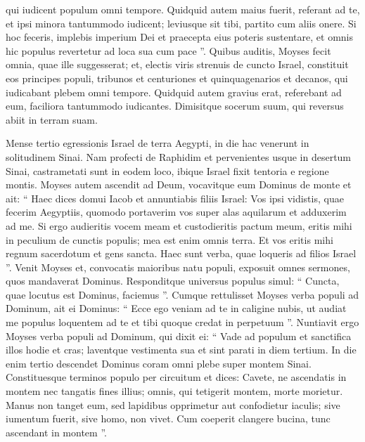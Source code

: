 \begin{biblechapter}
\begin{biblechapter}
\begin{biblechapter}
\begin{biblechapter}
\begin{biblechapter}
\begin{biblechapter}
\begin{biblechapter}
\begin{biblechapter}
\begin{biblechapter}
\begin{biblechapter}
\begin{biblechapter}
\begin{biblechapter}
\begin{biblechapter}
\begin{biblechapter}
\begin{biblechapter}
\begin{biblechapter}
\begin{biblechapter}
\begin{biblechapter}
\verse qui iudicent populum omni tempore. Quidquid autem maius fuerit, referant ad te, et ipsi minora tantummodo iudicent; leviusque sit tibi, partito cum aliis onere. 
\verse Si hoc feceris, implebis imperium Dei et praecepta eius poteris sustentare, et omnis hic populus revertetur ad loca sua cum pace ”.
 \verse Quibus auditis, Moyses fecit omnia, quae ille suggesserat; 
\verse et, electis viris strenuis de cuncto Israel, constituit eos principes populi, tribunos et centuriones et quinquagenarios et decanos, 
\verse qui iudicabant plebem omni tempore. Quidquid autem gravius erat, referebant ad eum, faciliora tantummodo iudicantes. 
\verse Dimisitque socerum suum, qui reversus abiit in terram suam.
 
\begin{biblechapter}
\verse Mense tertio egressionis Israel de terra Aegypti, in die hac venerunt in solitudinem Sinai. 
\verse Nam profecti de Raphidim et pervenientes usque in desertum Sinai, castrametati sunt in eodem loco, ibique Israel fixit tentoria e regione montis.
 \verse Moyses autem ascendit ad Deum, vocavitque eum Dominus de monte et ait:
 “ Haec dices domui Iacob
 et annuntiabis filiis Israel:
 \verse Vos ipsi vidistis, quae fecerim Aegyptiis,
 quomodo portaverim vos super alas aquilarum
 et adduxerim ad me.
 \verse Si ergo audieritis vocem meam
 et custodieritis pactum meum,
 eritis mihi in peculium de cunctis populis;
 mea est enim omnis terra.
 \verse Et vos eritis mihi regnum sacerdotum
 et gens sancta.
 Haec sunt verba, quae loqueris ad filios Israel ”.
 \verse Venit Moyses et, convocatis maioribus natu populi, exposuit omnes sermones, quos mandaverat Dominus. 
\verse Responditque universus populus simul: “ Cuncta, quae locutus est Dominus, faciemus ”. Cumque rettulisset Moyses verba populi ad Dominum, 
\verse ait ei Dominus: “ Ecce ego veniam ad te in caligine nubis, ut audiat me populus loquentem ad te et tibi quoque credat in perpetuum ”.
 Nuntiavit ergo Moyses verba populi ad Dominum, 
\verse qui dixit ei: “ Vade ad populum et sanctifica illos hodie et cras; laventque vestimenta sua 
\verse et sint parati in diem tertium. In die enim tertio descendet Dominus coram omni plebe super montem Sinai. 
\verse Constituesque terminos populo per circuitum et dices: Cavete, ne ascendatis in montem nec tangatis fines illius; omnis, qui tetigerit montem, morte morietur. 
\verse Manus non tanget eum, sed lapidibus opprimetur aut confodietur iaculis; sive iumentum fuerit, sive homo, non vivet. Cum coeperit clangere bucina, tunc ascendant in montem ”. 

\end{biblechapter}
\end{biblechapter}
\end{biblechapter}
\end{biblechapter}
\end{biblechapter}
\end{biblechapter}
\end{biblechapter}
\end{biblechapter}
\end{biblechapter}
\end{biblechapter}
\end{biblechapter}
\end{biblechapter}
\end{biblechapter}
\end{biblechapter}
\end{biblechapter}
\end{biblechapter}
\end{biblechapter}
\end{biblechapter}
\end{biblechapter}

